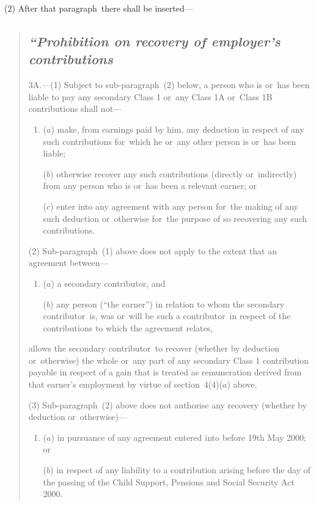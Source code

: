 \documentclass[12pt,a4paper]{article}
\begin{document}
(2) After that paragraph~there shall be inserted—
\begin{quotation}
\subsection*{\itshape “Prohibition on recovery of employer’s contributions}

3A.---(1) Subject to sub-paragraph~(2)  below, a person who is or~has been liable to pay any secondary Class 1 or~any Class 1A or~Class 1B contributions shall not—
\begin{enumerate}\item[]
($a$) make, from earnings paid by him, any deduction in respect of any such contributions for~which he or~any other person is or~has been liable;

($b$) otherwise recover any such contributions (directly or~indirectly) from any person who is or~has been a relevant earner; or

($c$) enter into any agreement with any person for~the making of any such deduction or~otherwise for~the purpose of so recovering any such contributions.
\end{enumerate}

(2) Sub-paragraph~(1)  above does not apply to the extent that an agreement between—
\begin{enumerate}\item[]
($a$) a secondary contributor, and

($b$) any person (“the earner”) in relation to whom the secondary contributor~is, was or~will be such a contributor~in respect of the contributions to which the agreement relates,
\end{enumerate}
allows the secondary contributor~to recover (whether by deduction or~otherwise) the whole or~any part of any secondary Class 1 contribution payable in respect of a gain that is treated as remuneration derived from that earner’s employment by virtue of section~4(4)($a$)  above.

(3) Sub-paragraph~(2)  above does not authorise any recovery (whether by deduction or~otherwise)—
\begin{enumerate}\item[]
($a$) in pursuance of any agreement entered into before 19th May 2000; or

($b$) in respect of any liability to a contribution arising before the day of the passing of the Child Support, Pensions and Social Security Act 2000. 
\end{enumerate}


\end{quotation}
\end{document}
